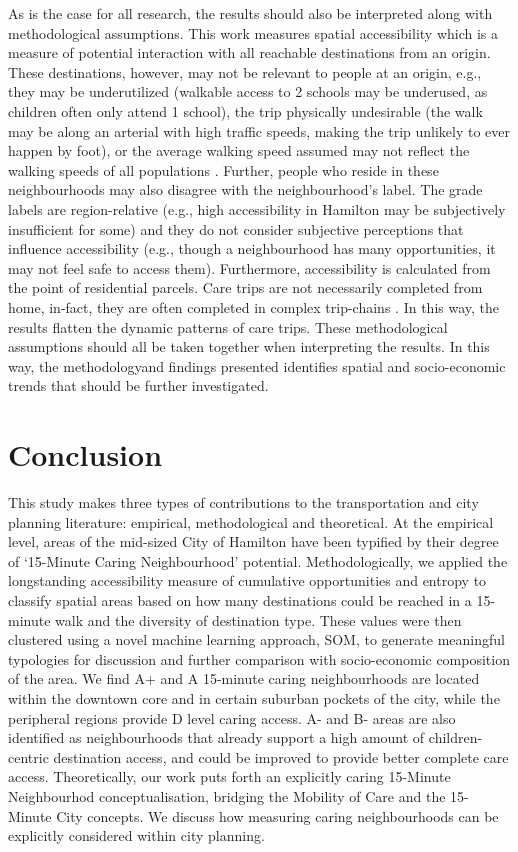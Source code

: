 \documentclass[
  authoryear,
  preprint,
  3p]{elsarticle}
\begin{document}
As is the case for all research, the results should also be interpreted
along with methodological assumptions. This work measures spatial
accessibility which is a measure of potential interaction with all
reachable destinations from an origin. These destinations, however, may
not be relevant to people at an origin, e.g., they may be underutilized
(walkable access to 2 schools may be underused, as children often only
attend 1 school), the trip physically undesirable (the walk may be along
an arterial with high traffic speeds, making the trip unlikely to ever
happen by foot), or the average walking speed assumed may not reflect
the walking speeds of all populations
\citep{willberg15minuteCityAll2023}. Further, people who reside in these
neighbourhoods may also disagree with the neighbourhood's label. The
grade labels are region-relative (e.g., high accessibility in Hamilton
may be subjectively insufficient for some) and they do not consider
subjective perceptions that influence accessibility (e.g., though a
neighbourhood has many opportunities, it may not feel safe to access
them). Furthermore, accessibility is calculated from the point of
residential parcels. Care trips are not necessarily completed from home,
in-fact, they are often completed in complex trip-chains
\citep{scheinerWomenComplexDaily2015}. In this way, the results flatten
the dynamic patterns of care trips. These methodological assumptions
should all be taken together when interpreting the results. In this way,
the methodologyand findings presented identifies spatial and
socio-economic trends that should be further investigated.

\section{Conclusion}\label{conclusion}

This study makes three types of contributions to the transportation and
city planning literature: empirical, methodological and theoretical. At
the empirical level, areas of the mid-sized City of Hamilton have been
typified by their degree of `15-Minute Caring Neighbourhood' potential.
Methodologically, we applied the longstanding accessibility measure of
cumulative opportunities and entropy to classify spatial areas based on
how many destinations could be reached in a 15-minute walk and the
diversity of destination type. These values were then clustered using a
novel machine learning approach, SOM, to generate meaningful typologies
for discussion and further comparison with socio-economic composition of
the area. We find A+ and A 15-minute caring neighbourhoods are located
within the downtown core and in certain suburban pockets of the city,
while the peripheral regions provide D level caring access. A- and B-
areas are also identified as neighbourhoods that already support a high
amount of children-centric destination access, and could be improved to
provide better complete care access. Theoretically, our work puts forth
an explicitly caring 15-Minute Neighbourhod conceptualisation, bridging
the Mobility of Care and the 15-Minute City concepts. We discuss how
measuring caring neighbourhoods can be explicitly considered within city
planning.
\end{document}
